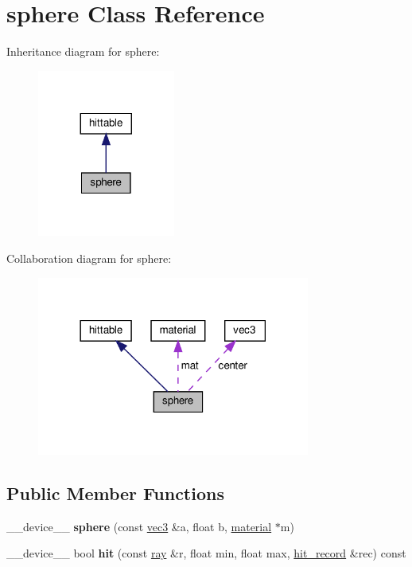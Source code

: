 \hypertarget{classsphere}{}\section{sphere Class Reference}
\label{classsphere}


Inheritance diagram for sphere\+:
\nopagebreak
\begin{figure}[H]
\begin{center}
\leavevmode
\includegraphics[width=128pt]{classsphere__inherit__graph}
\end{center}
\end{figure}


Collaboration diagram for sphere\+:
\nopagebreak
\begin{figure}[H]
\begin{center}
\leavevmode
\includegraphics[width=254pt]{classsphere__coll__graph}
\end{center}
\end{figure}
\subsection*{Public Member Functions}
\begin{DoxyCompactItemize}
\item 
\mbox{\label{classsphere_a8b9bfa0711d8833fdef2f8a1d260d051}} 
\+\_\+\+\_\+device\+\_\+\+\_\+ {\bfseries sphere} (const \hyperlink{classvec3}{vec3} \&a, float b, \hyperlink{classmaterial}{material} $\ast$m)
\item 
\mbox{\label{classsphere_a7135ee9a1ee15a445c1cee957e2e129d}} 
\+\_\+\+\_\+device\+\_\+\+\_\+ bool {\bfseries hit} (const \hyperlink{classray}{ray} \&r, float min, float max, \hyperlink{structhit__record}{hit\+\_\+record} \&rec) const
\end{DoxyCompactItemize}
